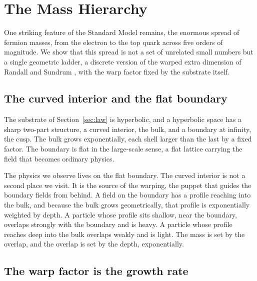 \section{The Mass Hierarchy} \label{sec:hierarchy}

One striking feature of the Standard Model remains, the enormous spread of fermion masses, from the electron to the top
quark across five orders of magnitude. We show that this spread is not a set of unrelated small numbers but a single
geometric ladder, a discrete version of the warped extra dimension of Randall and Sundrum \cite{randall1999}, with the
warp factor fixed by the substrate itself.

\subsection{The curved interior and the flat boundary}

The substrate of Section~\ref{sec:law} is hyperbolic, and a hyperbolic space has a sharp two-part structure, a curved
interior, the bulk, and a boundary at infinity, the cusp. The bulk grows exponentially, each shell larger than the last
by a fixed factor. The boundary is flat in the large-scale sense, a flat lattice carrying the field that becomes
ordinary physics.

The physics we observe lives on the flat boundary. The curved interior is not a second place we visit. It is the source
of the warping, the puppet that guides the boundary fields from behind. A field on the boundary has a profile reaching
into the bulk, and because the bulk grows geometrically, that profile is exponentially weighted by depth. A particle
whose profile sits shallow, near the boundary, overlaps strongly with the boundary and is heavy. A particle whose
profile reaches deep into the bulk overlaps weakly and is light. The mass is set by the overlap, and the overlap is set
by the depth, exponentially.

\subsection{The warp factor is the growth rate}

